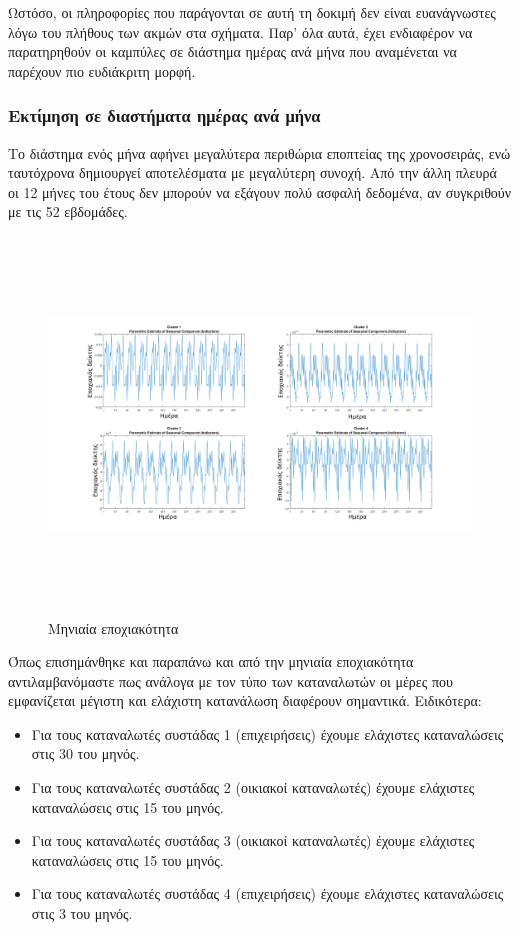 Ωστόσο, οι πληροφορίες που παράγονται σε αυτή τη δοκιμή δεν είναι ευανάγνωστες λόγω του πλήθους των ακμών στα σχήματα. Παρ' όλα αυτά, έχει ενδιαφέρον να παρατηρηθούν οι καμπύλες σε διάστημα ημέρας ανά μήνα που αναμένεται να παρέχουν πιο ευδιάκριτη μορφή.
\subsubsection{Εκτίμηση σε διαστήματα ημέρας ανά μήνα}
Το διάστημα ενός μήνα αφήνει μεγαλύτερα περιθώρια εποπτείας της χρονοσειράς, ενώ ταυτόχρονα δημιουργεί αποτελέσματα με μεγαλύτερη συνοχή. Από την άλλη πλευρά οι 12 μήνες του έτους δεν μπορούν να εξάγουν πολύ ασφαλή δεδομένα, αν συγκριθούν με τις 52 εβδομάδες.

\begin{figure}[ht!]
\centering
\includegraphics[width=180mm, height=100mm]{../../plots/Trend_estimation/seasonal_month_ALL.png}
\caption{Μηνιαία εποχιακότητα}
\label{fig:season daypermonth}
\end{figure}

Όπως επισημάνθηκε και παραπάνω και από την μηνιαία εποχιακότητα αντιλαμβανόμαστε πως ανάλογα με τον τύπο των καταναλωτών οι μέρες που εμφανίζεται μέγιστη και ελάχιστη κατανάλωση διαφέρουν σημαντικά. Ειδικότερα:
\begin{itemize}
\item Για τους καταναλωτές συστάδας 1 (επιχειρήσεις) έχουμε ελάχιστες καταναλώσεις στις 30 του μηνός.
\item Για τους καταναλωτές συστάδας 2 (οικιακοί καταναλωτές) έχουμε ελάχιστες καταναλώσεις στις 15 του μηνός.
\item Για τους καταναλωτές συστάδας 3 (οικιακοί καταναλωτές) έχουμε ελάχιστες καταναλώσεις στις 15 του μηνός.
\item Για τους καταναλωτές συστάδας 4 (επιχειρήσεις) έχουμε ελάχιστες καταναλώσεις στις 3 του μηνός.
\end{itemize}
\newpage
